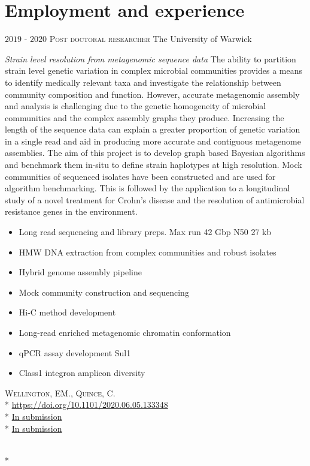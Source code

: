 \documentclass[hidelinks]{james-cv} %
\begin{document}
\section{Employment and experience}
\begin{entrylist}
\entry
{$2019$ - $2020$}
{\textsc{Post doctoral researcher}}
{The University of Warwick}
{\bodyfontsc\color{gray}{Strains and genomes:} \emph{Strain level resolution from metagenomic sequence data} 
\color{gray}\normalsize\thinfont The ability to partition strain level genetic variation in complex microbial communities provides a means to identify medically relevant taxa and investigate the relationship between community composition and function. However, accurate metagenomic assembly and analysis is challenging due to the genetic homogeneity of microbial communities and the complex assembly graphs they produce. Increasing the length of the sequence data can explain a greater proportion of genetic variation in a single read and aid in producing more accurate and contiguous metagenome assemblies. The aim of this project is to develop graph based Bayesian algorithms and benchmark them in-situ to define strain haplotypes at high resolution. Mock communities of sequenced isolates have been constructed and are used for algorithm benchmarking. This is followed by the application to a longitudinal study of a novel treatment for Crohn's disease and the resolution of antimicrobial resistance genes in the environment.           
\begin{itemize}
\item Long read sequencing and library preps. Max run 42 Gbp N50 27 kb
\item HMW DNA extraction from complex communities and robust isolates
\item Hybrid genome assembly pipeline
\item Mock community construction and sequencing
\item Hi-C method development
\item Long-read enriched metagenomic chromatin conformation 
\item qPCR assay development Sul1
\item Class1 integron amplicon diversity
\end{itemize}  
\bodyfontsc{}\textsc{Wellington, EM., Quince, C.}\\*
\bodyfontsc{}\thinfont\color{blue}\href{https://www.biorxiv.org/content/10.1101/2020.06.05.133348v1}{https://doi.org/10.1101/2020.06.05.133348}\\*
\bodyfontsc\nolinebreak\color{gray}{DOI: }\thinfont\color{blue}\href{https://www.biorxiv.org/content/10.1101/2020.06.05.133348v1}{In submission}\\*
\bodyfontsc\nolinebreak\color{gray}{DOI: }\thinfont\color{blue}\href{https://www.biorxiv.org/content/10.1101/2020.06.05.133348v1}{In submission}}\\*
\end{entrylist}
\end{document}
